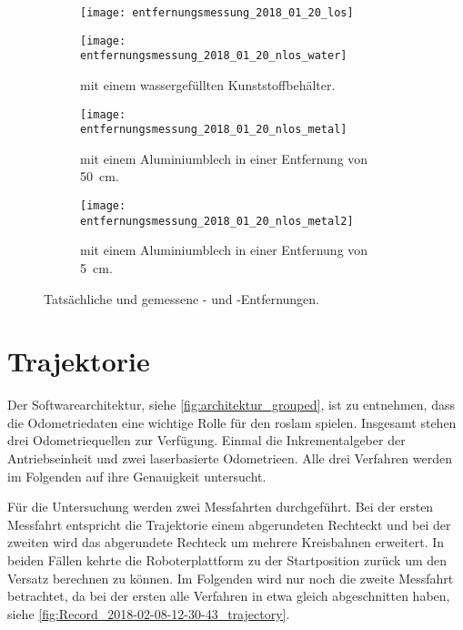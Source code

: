 \begin{figure}[ht]
	\centering
	\begin{subfigure}[t]{0.49\linewidth}
		\centering
		\texttt{[image: entfernungsmessung\_2018\_01\_20\_los]}
		\caption{}
		\label{fig:entfernungsmessung_2018_01_20_los}
	\end{subfigure}
	\hfill
	\begin{subfigure}[b]{0.49\linewidth}
		\centering
		\texttt{[image: entfernungsmessung\_2018\_01\_20\_nlos\_water]}
		\caption{ mit einem wassergefüllten Kunststoffbehälter.}
		\label{fig:entfernungsmessung_2018_01_20_nlos_water}
	\end{subfigure}
	\par
	\bigskip
	\begin{subfigure}[b]{0.49\linewidth}
		\centering
		\texttt{[image: entfernungsmessung\_2018\_01\_20\_nlos\_metal]}
		\caption{ mit einem Aluminiumblech in einer Entfernung von \SI{50}{\centi\meter}.}
		\label{fig:entfernungsmessung_2018_01_20_nlos_metal}
	\end{subfigure}
	\hfill
	\begin{subfigure}[b]{0.49\linewidth}
		\centering
		\texttt{[image: entfernungsmessung\_2018\_01\_20\_nlos\_metal2]}
		\caption{ mit einem Aluminiumblech in einer Entfernung von \SI{5}{\centi\meter}.}
		\label{fig:entfernungsmessung_2018_01_20_nlos_metal2}
	\end{subfigure}
	\caption{Tatsächliche und gemessene - und -Entfernungen.}
	\label{fig:entfernungsmessung_2018_01_20}
\end{figure}


%
%
%
\section{Trajektorie}

Der Softwarearchitektur, siehe \autoref{fig:architektur_grouped}, ist zu entnehmen, dass die Odometriedaten eine wichtige Rolle für den \gls{roslam} spielen. Insgesamt stehen drei Odometriequellen zur Verfügung. Einmal die Inkrementalgeber der Antriebseinheit und zwei laserbasierte Odometrieen. Alle drei Verfahren werden im Folgenden auf ihre Genauigkeit untersucht.

Für die Untersuchung werden zwei Messfahrten durchgeführt. Bei der ersten Messfahrt entspricht die Trajektorie einem abgerundeten Rechteckt und bei der zweiten wird das abgerundete Rechteck um mehrere Kreisbahnen erweitert. In beiden Fällen kehrte die Roboterplattform zu der Startposition zurück um den Versatz berechnen zu können. Im Folgenden wird nur noch die zweite Messfahrt betrachtet, da bei der ersten alle Verfahren in etwa gleich abgeschnitten haben, siehe \autoref{fig:Record_2018-02-08-12-30-43_trajectory}.

